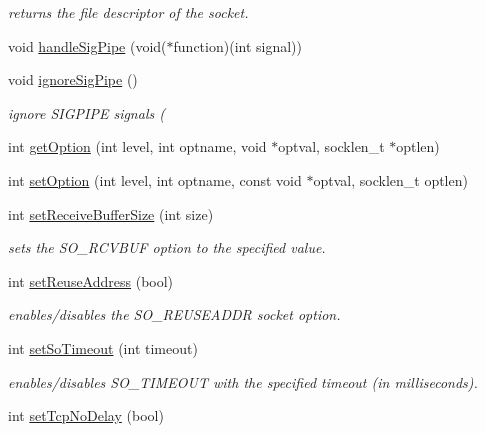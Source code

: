 \begin{DoxyCompactItemize}
\begin{DoxyCompactList}\small\item\em returns the file descriptor of the socket. \end{DoxyCompactList}\item 
void \hyperlink{classServerSocket_afe81d7c30d1e963e6a043b868560dbbd}{handle\-Sig\-Pipe} (void($\ast$function)(int signal))
\item 
void \hyperlink{classServerSocket_ac159a12414df54dfef149a8de6aacb20}{ignore\-Sig\-Pipe} ()
\begin{DoxyCompactList}\small\item\em ignore S\-I\-G\-P\-I\-P\-E signals ( \end{DoxyCompactList}\item 
int \hyperlink{classServerSocket_a7ad8a5581c52046e641b32d96eb23406}{get\-Option} (int level, int optname, void $\ast$optval, socklen\-\_\-t $\ast$optlen)
\item 
int \hyperlink{classServerSocket_ad69fa5c5891f028192a291044b9191e2}{set\-Option} (int level, int optname, const void $\ast$optval, socklen\-\_\-t optlen)
\item 
\hypertarget{classServerSocket_ab34154bc6114c638ae02f5e018121099}{int \hyperlink{classServerSocket_ab34154bc6114c638ae02f5e018121099}{set\-Receive\-Buffer\-Size} (int size)}\label{classServerSocket_ab34154bc6114c638ae02f5e018121099}

\begin{DoxyCompactList}\small\item\em sets the S\-O\-\_\-\-R\-C\-V\-B\-U\-F option to the specified value. \end{DoxyCompactList}\item 
\hypertarget{classServerSocket_ae60d7cc31ad535e5d3cac42e38b8ec98}{int \hyperlink{classServerSocket_ae60d7cc31ad535e5d3cac42e38b8ec98}{set\-Reuse\-Address} (bool)}\label{classServerSocket_ae60d7cc31ad535e5d3cac42e38b8ec98}

\begin{DoxyCompactList}\small\item\em enables/disables the S\-O\-\_\-\-R\-E\-U\-S\-E\-A\-D\-D\-R socket option. \end{DoxyCompactList}\item 
\hypertarget{classServerSocket_aedb9144c9c375fcb14ac47bcb9d2eb17}{int \hyperlink{classServerSocket_aedb9144c9c375fcb14ac47bcb9d2eb17}{set\-So\-Timeout} (int timeout)}\label{classServerSocket_aedb9144c9c375fcb14ac47bcb9d2eb17}

\begin{DoxyCompactList}\small\item\em enables/disables S\-O\-\_\-\-T\-I\-M\-E\-O\-U\-T with the specified timeout (in milliseconds). \end{DoxyCompactList}\item 
\hypertarget{classServerSocket_a9e5e1ee852ba26156c757a0086b780fe}{int \hyperlink{classServerSocket_a9e5e1ee852ba26156c757a0086b780fe}{set\-Tcp\-No\-Delay} (bool)}\label{classServerSocket_a9e5e1ee852ba26156c757a0086b780fe}


\end{DoxyCompactItemize}
